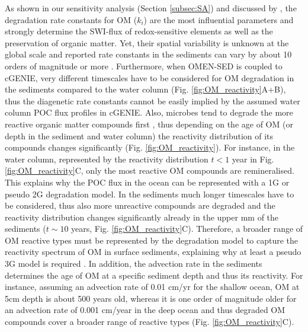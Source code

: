 \documentclass[gmd, manuscript]{copernicus}
\begin{document}
As shown in our sensitivity analysis (Section \ref{subsec:SA}) and discussed by \citet{arndt_quantifying_2013}, the 
degradation rate constants for OM ($k_i$) are the most influential parameters and strongly determine the SWI-flux of redox-sensitive elements as well as the preservation of organic matter. 
Yet, their spatial variability is unknown at the global scale and reported rate constants in the sediments can vary by about 10 orders of magnitude or more \citep{middelburg_organic_1993, arndt_quantifying_2013}. 
Furthermore, when OMEN-SED is coupled to cGENIE, very different timescales have to be considered for OM degradation in the sediments compared to the water column (Fig. \ref{fig:OM_reactivity}A+B), 
thus the diagenetic rate constants cannot be easily implied by the assumed water column POC flux profiles in cGENIE. 
Also, microbes tend to degrade the more reactive organic matter compounds first \citep{emerson_processes_1988, wakeham_compositions_1997, lee_composition_2000}, thus depending on the age of OM (or depth in the sediment and water column) the 
reactivity distribution of its compounds changes significantly (Fig. \ref{fig:OM_reactivity}). 
For instance, in the water column, represented by the reactivity distribution $t<1$ year in Fig. \ref{fig:OM_reactivity}C, only the most reactive OM compounds are 
remineralised. This explains why the POC flux in the ocean can be represented with a 1G or pseudo 2G degradation model. In the sediments much longer timescales have to be considered, 
thus also more unreactive compounds are degraded and the reactivity distribution changes significantly already in the upper mm of the sediments ($t \sim 10$ years, Fig. \ref{fig:OM_reactivity}C). 
Therefore, a broader range of OM reactive types must be represented by the degradation model to capture the reactivity spectrum of OM in surface sediments, explaining why at least a pseudo 3G model is required 
\citep[including two degradable and one refractory fraction][]{soetaert_model_1996, boudreau1997diagenetic, stolpovsky_toward_2015}. 
In addition, the advection rate in the sediments determines the age of OM at a specific sediment depth and thus its reactivity. 
For instance, assuming an advection rate of 0.01 cm/yr for the shallow ocean, OM at 5cm depth is about 500 years old, whereas it is one order of magnitude older for an advection rate of 0.001 cm/year in the deep ocean 
and thus degraded OM compounds cover a broader range of reactive types (Fig. \ref{fig:OM_reactivity}C).  
\end{document}
